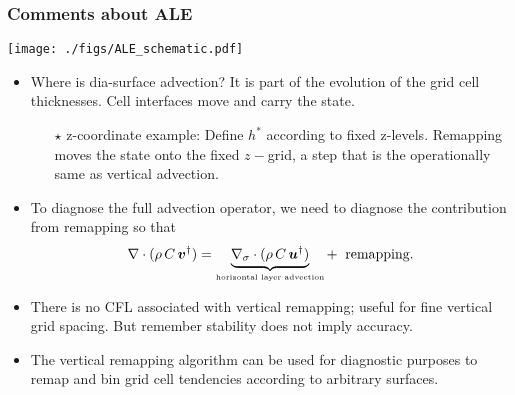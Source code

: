 \documentclass[10pt]{beamer}
\begin{document}
\begin{frame}
  \frametitle{Comments about ALE}

\begin{center}
{\texttt{[image: ./figs/ALE\_schematic.pdf]}}
\end{center}


\vspace{-.3cm} 
\begin{exampleblock}{}
\begin{itemize}


\item {\sc Where is dia-surface advection?}  It is part of the
  evolution of the grid cell thicknesses.  Cell interfaces move and
  carry the state.
   \begin{itemize}  \footnotesize 
   \item[$\star$] {\sc z-coordinate example:} Define $h^{*}$ according
     to fixed z-levels.  Remapping moves the state onto the fixed
     $z-$grid, a step that is the operationally same as vertical
     advection.
   \end{itemize}

 \item To diagnose the full advection operator, we need to diagnose
   the contribution from remapping so that
\begin{equation}
    \nabla \cdot (\rho \, C \, {\bm v}^{\dagger} ) = \underbrace{ \nabla_{\sigma} \cdot (\rho \, C \, {\bm u}^{\dagger} )}_{\mbox{\tiny horizontal layer advection}}
  + \; \; \mbox{remapping}.
\end{equation}

\item There is no CFL associated with vertical remapping; useful for
  fine vertical grid spacing.  But remember stability does not imply
  accuracy.

\item The vertical remapping algorithm can be used for diagnostic
  purposes to remap and bin grid cell tendencies according to
  arbitrary surfaces.

\end{itemize}
\end{exampleblock}{}

\end{frame}
\end{document}
